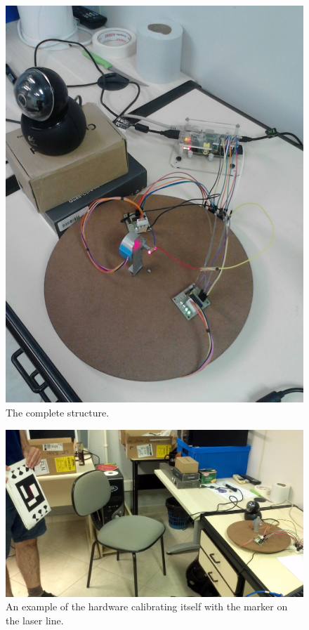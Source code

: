 \documentclass{article}
\begin{document}
\begin{figure}[h!]
    \includegraphics[scale=0.2]{imgs/hardware.jpg}
    \caption{The complete structure.}
    \label{fig:hardware}
\end{figure}

\begin{figure}[h!]
    \includegraphics[scale=0.1]{imgs/marker_and_hardware.jpg}
    \caption{
        An example of the hardware calibrating itself
        with the marker on the laser line.
    }
    \label{fig:h_and_m}
\end{figure}
\end{document}
